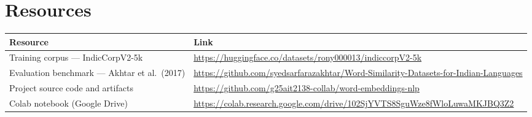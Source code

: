 \documentclass[conference,10pt]{IEEEtran}
\begin{document}
\section*{Resources}
\begin{center}
\renewcommand{\arraystretch}{1.3}
\scriptsize
\setlength{\tabcolsep}{3pt}
\begin{tabular}{|>{\raggedright\arraybackslash}p{2.5cm}|>{\raggedright\arraybackslash}p{5.15cm}|}
\hline
\rowcolor{srcblue!15}
\textbf{Resource} & \textbf{Link} \\
\hline
Training corpus --- IndicCorpV2-5k & \url{https://huggingface.co/datasets/rony000013/indiccorpV2-5k} \\
\hline
Evaluation benchmark --- Akhtar et al.\ (2017) & \url{https://github.com/syedsarfarazakhtar/Word-Similarity-Datasets-for-Indian-Languages} \\
\hline
Project source code and artifacts & \url{https://github.com/g25ait2138-collab/word-embeddings-nlp} \\
\hline
Colab notebook (Google Drive) & \url{https://colab.research.google.com/drive/102SjYVTS8SguWze8fWloLuwaMKJBQ3Z2} \\
\hline
\end{tabular}
\end{center}
\end{document}
